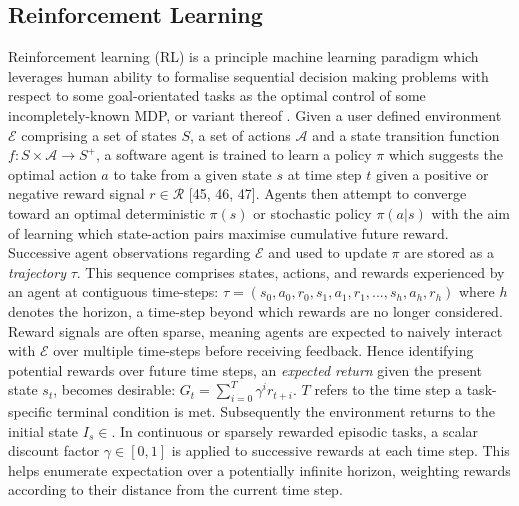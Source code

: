 \documentclass[runningheads]{llncs}
\begin{document}
\subsection{Reinforcement Learning}

Reinforcement learning (RL) is a principle machine learning paradigm which leverages human ability to formalise sequential decision making problems with respect to some goal-orientated tasks as the optimal control of some incompletely-known MDP, or variant thereof \cite{sutton2018reinforcement}. Given a user defined environment $\mathcal{E}$ comprising a set of states $S$, a set of actions $\mathcal{A}$ and a state transition function $f: S \times \mathcal{A} \to S^+$, a software agent is trained to learn a policy $\pi$ which suggests the optimal action $a$ to take from a given state $s$ at time step $t$ given a positive or negative reward signal $r \in \mathcal{R}$ [45, 46, 47]. Agents then attempt to converge toward an optimal deterministic $\pi(s)$ or stochastic policy $\pi(a|s)$ with the aim of learning which state-action pairs maximise cumulative future reward. Successive agent observations regarding $\mathcal{E}$ and used to update $\pi$ are stored as a \textit{trajectory} $\tau$. This sequence comprises states, actions, and rewards experienced by an agent at contiguous time-steps:
\begin{math}
	\tau = (s_0, a_0, r_0, s_1,a_1,r_1,...,s_h,a_h,r_h)
\end{math}
where $h$ denotes the horizon, a time-step beyond which rewards are no longer considered. \\

Reward signals are often sparse, meaning agents are expected to naively interact with $\mathcal{E}$ over multiple time-steps before receiving feedback. Hence identifying potential rewards over future time steps, an \textit{expected return} given the present state $s_t$, becomes desirable: \begin{math}
	G_t = \sum_{i=0}^{T} \gamma^{i}r_{t+i}.
\end{math}
$T$ refers to the time step a task-specific terminal condition is met. Subsequently the environment returns to the initial state $I_s \in $. In continuous or sparsely rewarded episodic tasks, a scalar discount factor $\gamma \in [0,1]$ is applied to successive rewards at each time step. This helps enumerate expectation over a potentially infinite horizon, weighting rewards according to their distance from the current time step. \\
\end{document}
